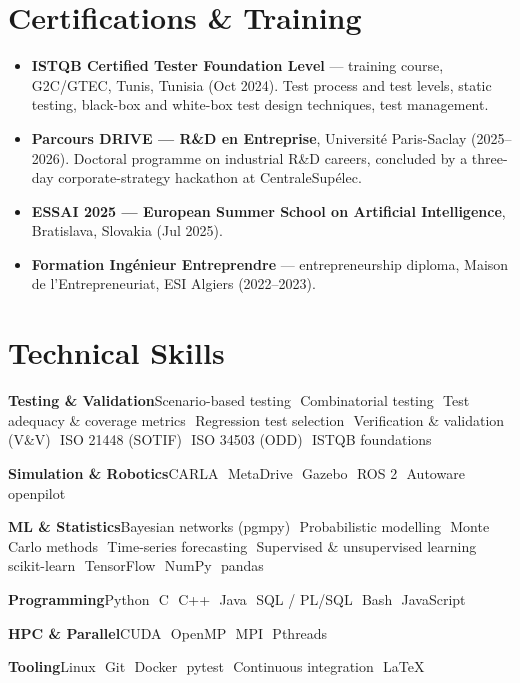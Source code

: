 \documentclass[a4paper,10pt]{article}
\newcommand{\cvskill}[2]{%
  \textbf{#1}\hspace{0.6em}#2\par\vspace{2pt}%
}
\newcommand{\cvdot}{\,\textperiodcentered\,}
\begin{document}
\section*{Certifications \& Training}

\begin{itemize}
  \item \textbf{ISTQB Certified Tester Foundation Level} --- training course, G2C/GTEC, Tunis, Tunisia (Oct 2024). Test process and test levels, static testing, black-box and white-box test design techniques, test management.
  \item \textbf{Parcours DRIVE\textregistered{} --- R\&D en Entreprise}, Universit\'e Paris-Saclay (2025--2026). Doctoral programme on industrial R\&D careers, concluded by a three-day corporate-strategy hackathon at CentraleSup\'elec.
  \item \textbf{ESSAI 2025 --- European Summer School on Artificial Intelligence}, Bratislava, Slovakia (Jul 2025).
  \item \textbf{Formation Ing\'enieur Entreprendre} --- entrepreneurship diploma, Maison de l'Entrepreneuriat, ESI Algiers (2022--2023).
\end{itemize}

\section*{Technical Skills}

\cvskill{Testing \& Validation}{Scenario-based testing \cvdot Combinatorial testing \cvdot Test adequacy \& coverage metrics \cvdot Regression test selection \cvdot Verification \& validation (V\&V) \cvdot ISO 21448 (SOTIF) \cvdot ISO 34503 (ODD) \cvdot ISTQB foundations}
\cvskill{Simulation \& Robotics}{CARLA \cvdot MetaDrive \cvdot Gazebo \cvdot ROS 2 \cvdot Autoware \cvdot openpilot}
\cvskill{ML \& Statistics}{Bayesian networks (pgmpy) \cvdot Probabilistic modelling \cvdot Monte Carlo methods \cvdot Time-series forecasting \cvdot Supervised \& unsupervised learning \cvdot scikit-learn \cvdot TensorFlow \cvdot NumPy \cvdot pandas}
\cvskill{Programming}{Python \cvdot C \cvdot C++ \cvdot Java \cvdot SQL / PL/SQL \cvdot Bash \cvdot JavaScript}
\cvskill{HPC \& Parallel}{CUDA \cvdot OpenMP \cvdot MPI \cvdot Pthreads}
\cvskill{Tooling}{Linux \cvdot Git \cvdot Docker \cvdot pytest \cvdot Continuous integration \cvdot \LaTeX}
\end{document}
